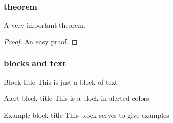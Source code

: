 \documentclass{beamer}
\begin{document}
\begin{frame}
\frametitle{theorem}
\begin{theorem}
A very important theorem.
\end{theorem}
\begin{proof}
An easy proof.
\end{proof}
\end{frame}


\begin{frame}
\frametitle{blocks and text}
\begin{block}{Block title}
This is just a block of text
\end{block}

\begin{alertblock}{Alert-block title}
This is a block in alerted colors
\end{alertblock}

\begin{exampleblock}{Example-block title}
This block serves to give examples
\end{exampleblock}
\end{frame}
\end{document}

